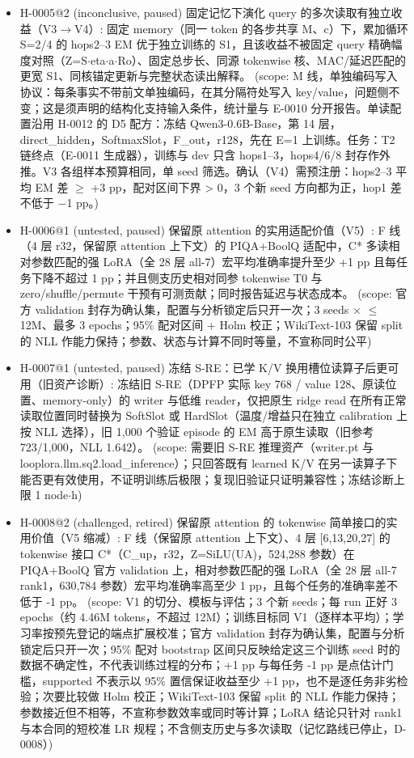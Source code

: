 \documentclass[11pt]{article}
\begin{document}
\begin{itemize}
\item H-0005@2 (inconclusive, paused) 固定记忆下演化 query 的多次读取有独立收益（V3\ensuremath{\rightarrow}V4）: 固定 memory（同一 token 的各步共享 M、c）下，累加循环 S=2/4 的 hops2--3 EM 优于独立训练的 S1，且该收益不被固定 query 精确幅度对照（Z=S\ensuremath{\cdot}eta\ensuremath{\cdot}a\ensuremath{\cdot}Ro）、固定总步长、同源 tokenwise 核、MAC/延迟匹配的更宽 S1、同核锚定更新与完整状态读出解释。 (scope: M 线，单独编码写入协议：每条事实不带前文单独编码，在其分隔符处写入 key/value，问题侧不变；这是须声明的结构化支持输入条件，统计量与 E-0010 分开报告。单读配置沿用 H-0012 的 D5 配方：冻结 Qwen3-0.6B-Base，第 14 层，direct\_hidden，SoftmaxSlot，F\_out，r128，先在 E=1 上训练。任务：T2 链终点（E-0011 生成器），训练与 dev 只含 hops1--3，hops4/6/8 封存作外推。V3 各组样本预算相同，单 seed 筛选。确认（V4）需预注册：hops2--3 平均 EM 差 \ensuremath{\geq} +3 pp，配对区间下界 \textgreater{} 0，3 个新 seed 方向都为正，hop1 差不低于 \ensuremath{-}1 pp。)
\item H-0006@1 (untested, paused) 保留原 attention 的实用适配价值（V5）: F 线（4 层 r32，保留原 attention 上下文）的 PIQA+BoolQ 适配中，C* 多读相对参数匹配的强 LoRA（全 28 层 all-7）宏平均准确率提升至少 +1 pp 且每任务下降不超过 1 pp；并且侧支历史相对同参 tokenwise T0 与 zero/shuffle/permute 干预有可测贡献；同时报告延迟与状态成本。 (scope: 官方 validation 封存为确认集，配置与分析锁定后只开一次；3 seeds \ensuremath{\times} \ensuremath{\leq}12M、最多 3 epochs；95\% 配对区间 + Holm 校正；WikiText-103 保留 split 的 NLL 作能力保持；参数、状态与计算不同时等量，不宣称同时公平)
\item H-0007@1 (untested, paused) 冻结 S-RE：已学 K/V 换用槽位读算子后更可用（旧资产诊断）: 冻结旧 S-RE（DPFP 实际 key 768 / value 128、原读位置、memory-only）的 writer 与低维 reader，仅把原生 ridge read 在所有正常读取位置同时替换为 SoftSlot 或 HardSlot（温度/增益只在独立 calibration 上按 NLL 选择），旧 1,000 个验证 episode 的 EM 高于原生读取（旧参考 723/1,000，NLL 1.642）。 (scope: 需要旧 S-RE 推理资产（writer.pt 与 looplora.llm.sq2.load\_inference）；只回答既有 learned K/V 在另一读算子下能否更有效使用，不证明训练后极限；复现旧验证只证明兼容性；冻结诊断上限 1 node\ensuremath{\cdot}h)
\item H-0008@2 (challenged, retired) 保留原 attention 的 tokenwise 简单接口的实用价值（V5 缩减）: F 线（保留原 attention 上下文）、4 层 [6,13,20,27] 的 tokenwise 接口 C*（C\_up，r32，Z=SiLU(UA)，524,288 参数）在 PIQA+BoolQ 官方 validation 上，相对参数匹配的强 LoRA（全 28 层 all-7 rank1，630,784 参数）宏平均准确率高至少 1 pp，且每个任务的准确率差不低于 -1 pp。 (scope: V1 的切分、模板与评估；3 个新 seeds；每 run 正好 3 epochs（约 4.46M tokens，不超过 12M）；训练目标同 V1（逐样本平均）；学习率按预先登记的端点扩展校准；官方 validation 封存为确认集，配置与分析锁定后只开一次；95\% 配对 bootstrap 区间只反映给定这三个训练 seed 时的数据不确定性，不代表训练过程的分布；+1 pp 与每任务 -1 pp 是点估计门槛，supported 不表示以 95\% 置信保证收益至少 +1 pp，也不是逐任务非劣检验；次要比较做 Holm 校正；WikiText-103 保留 split 的 NLL 作能力保持；参数接近但不相等，不宣称参数效率或同时等计算；LoRA 结论只针对 rank1 与本合同的短校准 LR 规程；不含侧支历史与多次读取（记忆路线已停止，D-0008）)

\end{itemize}
\end{document}
